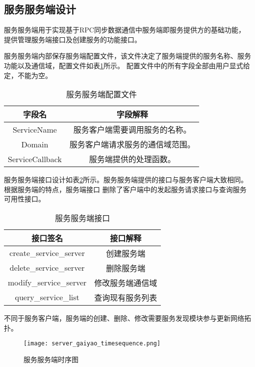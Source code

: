 \subsection{服务服务端设计}
服务服务端用于实现基于RPC同步数据通信中服务端即服务提供方的基础功能，提供管理服务端接口及创建服务的功能接口。

服务服务端内部保存服务端配置文件，该文件决定了服务端提供的服务名称、服务功能以及通信域，配置文件如表\ref{service_server_config_file}所示。
配置文件中的所有字段全部由用户显式给定，不能为空。
\begin{table}[H]
  \centering\small
  \caption{服务服务端配置文件}
  \label{service_server_config_file}
  \begin{tabular}{cc}
    \toprule
    字段名 & 字段解释 \\
    \midrule
    ServiceName & 服务客户端需要调用服务的名称。\\
    Domain & 服务客户端请求服务的通信域范围。\\
    ServiceCallback & 服务端提供的处理函数。\\
    \bottomrule
  \end{tabular}
\end{table}

服务服务端接口设计如表\ref{service_server_interface}所示。服务服务端提供的接口与服务客户端大致相同。根据服务端的特点，服务端接口
删除了客户端中的发起服务请求接口与查询服务可用性接口。
\begin{table}[htb]
  \centering\small
  \caption{服务服务端接口}
  \label{service_server_interface}
  \begin{tabular}{cc}
    \toprule
    接口签名 & 接口解释 \\
    \midrule
    create\_service\_server & 创建服务端 \\
    delete\_service\_server & 删除服务端\\
    modify\_service\_server & 修改服务端通信域\\
    query\_service\_list & 查询现有服务列表\\
    \bottomrule
  \end{tabular}
\end{table}

不同于服务客户端，服务端的创建、删除、修改需要服务发现模块参与更新网络拓扑。

\begin{figure}[H]
  \centering
  \texttt{[image: server\_gaiyao\_timesequence.png]}
  \caption{服务服务端时序图}
  \label{server_gaiyao_timesequence}
\end{figure}

